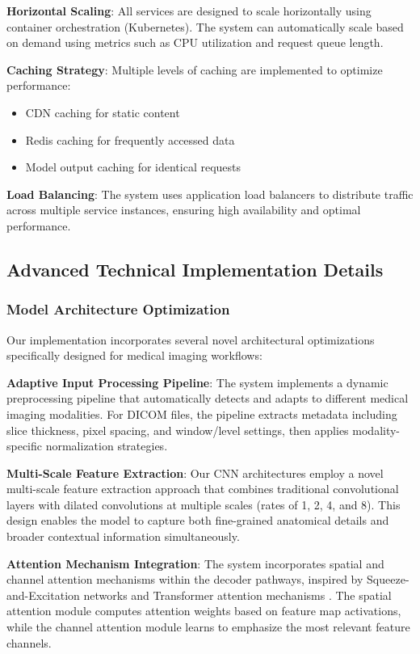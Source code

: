 \documentclass[12pt,a4paper]{article}
\begin{document}
\textbf{Horizontal Scaling}: All services are designed to scale horizontally using container orchestration (Kubernetes). The system can automatically scale based on demand using metrics such as CPU utilization and request queue length.

\textbf{Caching Strategy}: Multiple levels of caching are implemented to optimize performance:
\begin{itemize}
    \item CDN caching for static content
    \item Redis caching for frequently accessed data
    \item Model output caching for identical requests
\end{itemize}

\textbf{Load Balancing}: The system uses application load balancers to distribute traffic across multiple service instances, ensuring high availability and optimal performance.

\subsection{Advanced Technical Implementation Details}

\subsubsection{Model Architecture Optimization}

Our implementation incorporates several novel architectural optimizations specifically designed for medical imaging workflows:

\textbf{Adaptive Input Processing Pipeline}: The system implements a dynamic preprocessing pipeline that automatically detects and adapts to different medical imaging modalities. For DICOM files, the pipeline extracts metadata including slice thickness, pixel spacing, and window/level settings, then applies modality-specific normalization strategies.

\textbf{Multi-Scale Feature Extraction}: Our CNN architectures employ a novel multi-scale feature extraction approach that combines traditional convolutional layers with dilated convolutions at multiple scales (rates of 1, 2, 4, and 8). This design enables the model to capture both fine-grained anatomical details and broader contextual information simultaneously.

\textbf{Attention Mechanism Integration}: The system incorporates spatial and channel attention mechanisms within the decoder pathways, inspired by Squeeze-and-Excitation networks \cite{hu2018squeeze} and Transformer attention mechanisms \cite{vaswani2017attention}. The spatial attention module computes attention weights based on feature map activations, while the channel attention module learns to emphasize the most relevant feature channels.
\end{document}
